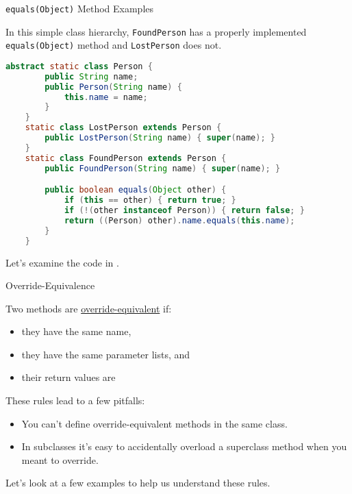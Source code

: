 \documentclass{beamer}
\begin{document}
\begin{frame}[fragile]{{\tt equals(Object)} Method Examples}

\vspace{-.05in}
In this simple class hierarchy, {\tt FoundPerson} has a properly implemented {\tt equals(Object)} method and {\tt LostPerson} does not.
\vspace{-.05in}
\begin{lstlisting}[language=Java]
    abstract static class Person {
        public String name;
        public Person(String name) {
            this.name = name;
        }
    }
    static class LostPerson extends Person {
        public LostPerson(String name) { super(name); }
    }
    static class FoundPerson extends Person {
        public FoundPerson(String name) { super(name); }

        public boolean equals(Object other) {
            if (this == other) { return true; }
            if (!(other instanceof Person)) { return false; }
            return ((Person) other).name.equals(this.name);
        }
    }
\end{lstlisting}
\vspace{-.05in}
Let's examine the code in .

\end{frame}

\begin{frame}[fragile]{Override-Equivalence}

Two methods are \href{http://docs.oracle.com/javase/specs/jls/se8/html/jls-8.html#jls-8.4.2}{override-equivalent} if:
\begin{itemize}
\item they have the same name,
\item they have the same parameter lists, and
\item their return values are 
\end{itemize}

These rules lead to a few pitfalls:

\begin{itemize}
\item You can't define override-equivalent methods in the same class.
\item In subclasses it's easy to accidentally overload a superclass method when you meant to override.
\end{itemize}

Let's look at a few examples to help us understand these rules.

\end{frame}
\end{document}
